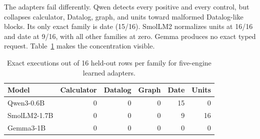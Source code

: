 \documentclass[10pt]{article}
\begin{document}
\begin{table}[ht]
\centering
\caption{Five-engine results. Selection, exactness, and use are positive-row
rates; FAR is over controls; final includes controls. A dash means use was not
assessed.}
\label{tab:five}
\end{table}

The adapters fail differently.  Qwen detects every positive and every control,
but collapses calculator, Datalog, graph, and units toward malformed Datalog-like
blocks.  Its only exact family is date (15/16).  SmolLM2 normalizes units at
16/16 and date at 9/16, with all other families at zero.  Gemma produces no exact
typed request.  Table~\ref{tab:family} makes the concentration visible.

\begin{table}[ht]
\centering
\caption{Exact executions out of 16 held-out rows per family for five-engine
learned adapters.}
\label{tab:family}
\begin{tabular}{lrrrrr}
\toprule
Model & Calculator & Datalog & Graph & Date & Units \\
\midrule
Qwen3-0.6B & 0 & 0 & 0 & 15 & 0 \\
SmolLM2-1.7B & 0 & 0 & 0 & 9 & 16 \\
Gemma3-1B & 0 & 0 & 0 & 0 & 0 \\
\bottomrule
\end{tabular}
\end{table}
\end{document}
